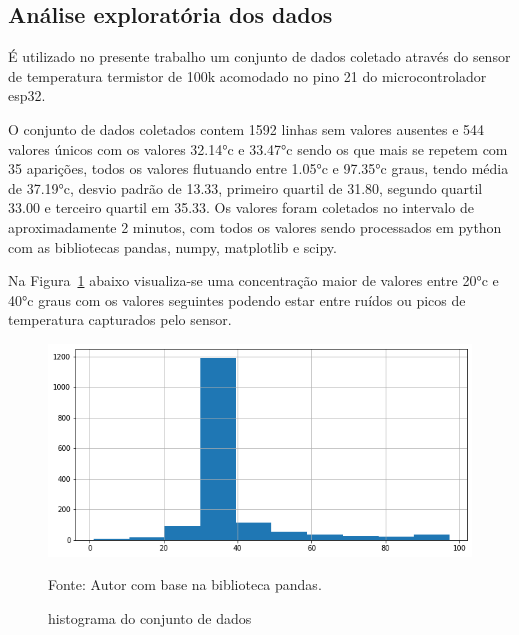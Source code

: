 



\subsection{Análise exploratória dos dados}
É utilizado no presente trabalho um conjunto de dados coletado através do sensor de temperatura termistor de 100k acomodado no pino 21 do microcontrolador esp32. 

O conjunto de dados coletados contem 1592 linhas sem valores ausentes e 544 valores únicos com os valores \ang{32.14}c e \ang{33.47}c sendo os que mais se repetem com 35 aparições, todos os valores flutuando entre \ang{1.05}c e \ang{97.35}c graus, tendo média de \ang{37.19}c, desvio padrão de 13.33, primeiro quartil de 31.80, segundo quartil 33.00 e terceiro quartil em 35.33. 
Os valores foram coletados no intervalo de aproximadamente 2 minutos, com todos os valores sendo processados em python com as bibliotecas pandas, numpy, matplotlib e scipy.


Na Figura~\ref{fig: hist} abaixo visualiza-se uma concentração maior de valores entre \ang{20}c e \ang{40}c graus com os valores seguintes podendo estar entre ruídos ou picos de temperatura capturados pelo sensor. 

\begin{figure}[H]
	\centering
	\includegraphics[width=15cm]{imagens/sensores/hist.png}
	\caption{histograma do conjunto de dados}
	Fonte: Autor com base na biblioteca pandas.
	\label{fig: hist}
\end{figure}

